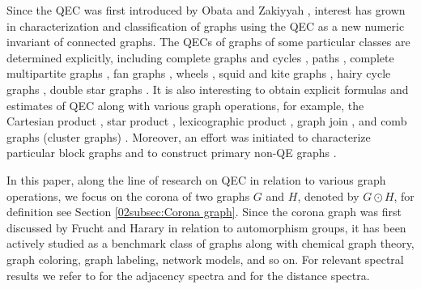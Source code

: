 \documentclass[12pt,a4paper]{article}
\newcommand{\1}{{\bm 1}}
\numberwithin{equation}{section}
\begin{document}
Since the QEC was first introduced 
by Obata and Zakiyyah \cite{Obata-Zakiyyah2018},
interest has grown in characterization and
classification of graphs using the QEC
as a new numeric invariant of connected graphs.
The QECs of graphs of some particular classes are
determined explicitly, including
complete graphs and cycles \cite{Obata-Zakiyyah2018},
paths \cite{Mlotkowski2022},
complete multipartite graphs \cite{Obata2023b},
fan graphs \cite{Mlotkowski-Obata2025a, Mlotkowski-Obata2025b},
wheels \cite{Obata2017},
squid and kite graphs \cite{Purwaningsih-Sugeng2021},
hairy cycle graphs \cite{Irawan-Sugeng2021},
double star graphs \cite{Choudhury-Nandi2023}.
It is also interesting to obtain explicit formulas 
and estimates of QEC along with various graph operations,
for example, the Cartesian product \cite{Obata-Zakiyyah2018},
star product \cite{Baskoro-Obata2021, 
Mlotkowski-Obata2020, Obata-Zakiyyah2018}, 
lexicographic product \cite{Lou-Obata-Huang2022}, 
graph join \cite{Lou-Obata-Huang2022, Mlotkowski-Obata2025a},
and comb graphs (cluster graphs) \cite{Choudhury-Nandi2023}. 
Moreover, an effort was initiated to characterize
particular block graphs \cite{Baskoro-Obata2024}
and to construct primary non-QE graphs \cite{Obata2023a,Obata2023b}.

In this paper, 
along the line of research
on QEC in relation to various graph operations,
we focus on the corona of two graphs $G$ and $H$,
denoted by $G\odot H$,
for definition see Section \ref{02subsec:Corona graph}.
Since the corona graph was first discussed by
Frucht and Harary \cite{Frucht-Harary1970}
in relation to automorphism groups,
it has been actively studied as a benchmark class of graphs
along with chemical graph theory, graph coloring, 
graph labeling, network models, and so on.
For relevant spectral results we refer to
\cite{Barik-Pati-Sarma2007} for the adjacency spectra
and \cite{Indulal-Stevanovic2015} for the distance spectra.
\end{document}
